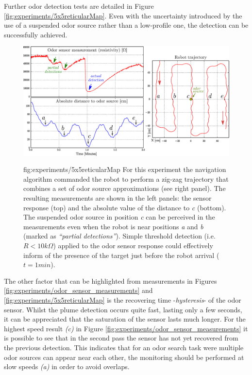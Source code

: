 Further odor detection tests are detailed in Figure \ref{fig:experiments/5x5reticularMap}. Even with the uncertainty introduced by the use of a suspended odor source rather than a low-profile one, the detection can be successfully achieved.
\begin{figure}[h!]
\centerline{\mbox{\includegraphics[width=16cm]{images/experiments/5x5reticularMap.eps}}}
{fig:experiments/5x5reticularMap}{
For this experiment the navigation algorithm commanded the robot to perform a zig-zag trajectory that combines a set of odor source approximations (see right panel).
The resulting measurements are shown in the left panels: the sensor response (top) and the absolute value of the distance to \emph{c} (bottom).
The suspended odor source in position \emph{c} can be perceived in the measurements even when the robot is near positions \emph{a} and \emph{b} (marked as \emph{``partial detections''}).
Simple threshold detection (i.e. $R<10k\Omega$) applied to the odor sensor response could effectively inform of the presence of the target just before the robot arrival ($t=1min$).
}
\end{figure}




The other factor that can be highlighted from measurements in Figures \ref{fig:experiments/odor_sensor_measurements} and \ref{fig:experiments/5x5reticularMap} is the recovering time -\emph{hysteresis}- of the odor sensor. Whilst the plume detection occurs quite fast, lasting only a few seconds, it can be appreciated that the saturation of the sensor lasts much longer.
For the highest speed result \emph{(c)} in Figure \ref{fig:experiments/odor_sensor_measurements} it is possible to see that in the second pass the sensor has not yet recovered from the previous detection.
This indicates that for an odor search task were multiple odor sources can appear near each other, the monitoring should be performed at slow speeds \emph{(a)} in order to avoid overlaps.



